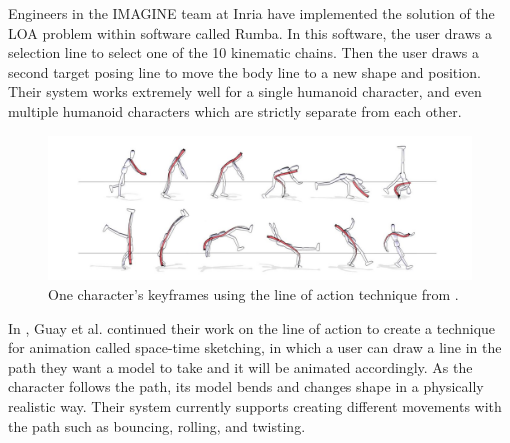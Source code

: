 Engineers in the IMAGINE team at Inria have implemented the solution of the LOA problem within software called Rumba. In this software, the user draws a selection line to select one of the 10 kinematic chains. Then the user draws a second target posing line to move the body line to a new shape and position. Their system works extremely well for a single humanoid character, and even multiple humanoid characters which are strictly separate from each other.

\begin{figure}[!h]
\includegraphics[scale=0.4]{img/baseline}
\caption{One character's keyframes using the line of action technique from \citep{guay2013line}.}
\end{figure}


In \citep{guay2015space}, Guay et al. continued their work on the line of action to create a technique for animation called space-time sketching, in which a user can draw a line in the path they want a model to take and it will be animated accordingly. As the character follows the path, its model bends and changes shape in a physically realistic way. Their system currently supports creating different movements with the path such as bouncing, rolling, and twisting.

